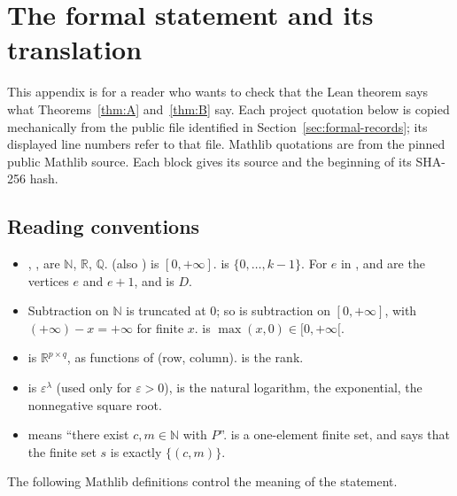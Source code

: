 \documentclass[11pt,a4paper]{article}
\theoremstyle{definition}
\theoremstyle{remark}
\numberwithin{equation}{section}
\newcommand{\N}{\mathbb{N}}
\newcommand{\Q}{\mathbb{Q}}
\newcommand{\R}{\mathbb{R}}
\newcommand{\eps}{\varepsilon}
\begin{document}
\section{The formal statement and its translation}\label{app:lean}

This appendix is for a reader who wants to check that the Lean theorem says what Theorems~\ref{thm:A} and~\ref{thm:B} say. Each project quotation below is copied mechanically from the public file  identified in Section~\ref{sec:formal-records}; its displayed line numbers refer to that file. Mathlib quotations are from the pinned public Mathlib source. Each block gives its source and the beginning of its SHA-256 hash.

\subsection{Reading conventions}\label{app:conventions}
\begin{itemize}
\item {}, ,  are $\N$, $\R$, $\Q$.  (also ) is $[0,+\infty]$.  is $\{0,\dots,k-1\}$. For $e$ in ,  and  are the vertices $e$ and $e+1$, and  is $D$.
\item Subtraction on $\N$ is truncated at $0$; so is subtraction on $[0,+\infty]$, with $(+\infty)-x=+\infty$ for finite $x$.  is $\max(x,0)\in[0,+\infty[$.
\item {} is $\R^{p\times q}$, as functions of (row, column).  is the rank.
\item {} is $\eps^\lambda$ (used only for $\eps>0$),  is the natural logarithm,  the exponential,  the nonnegative square root.
\item {} means ``there exist $c,m\in\N$ with $P$''.  is a one-element finite set, and  says that the finite set $s$ is exactly $\{(c,m)\}$.
\end{itemize}
The following Mathlib definitions control the meaning of the statement.
\end{document}
